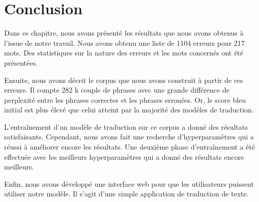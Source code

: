 \section{Conclusion}%
\label{sec.results.conclusion}

Dans ce chapitre, nous avons présenté les résultats que nous avons obtenus à l'issue de notre travail.
Nous avons obtenu une liste de 1104 erreurs pour 217 mots.
Des statistiques sur la nature des erreurs et les mots concernés ont été présentées.

Ensuite, nous avons décrit le corpus que nous avons construit à partir de ces erreurs.
Il compte 282 k couple de phrases avec une grande différence de perplexité 
entre les phrases correctes et les phrases erronées.
Or, le score \gls{bleu} initial est plus élevé que celui atteint par la majorité des modèles de traduction.

L'entraînement d'un modèle de traduction sur ce corpus a donné des résultats satisfaisants.
Cependant, nous avons fait une recherche d'hyperparamètres qui a réussi à améliorer encore les résultats.
Une deuxième phase d'entraînement a été effectuée avec les meilleurs hyperparamètres 
qui a donné des résultats encore meilleurs.

Enfin, nous avons développé une interface web pour que les utilisateurs puissent utiliser notre modèle.
Il s'agit d'une simple application de traduction de texte.